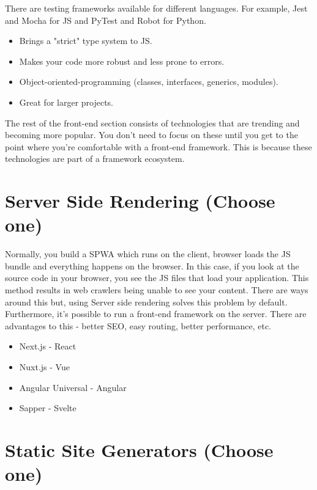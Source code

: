There are testing frameworks available for different languages. For example, Jest and Mocha for JS and PyTest and Robot for Python.
\begin{itemize}
    \item Brings a "strict" type system to JS. 
    \item Makes your code more robust and less prone to errors.
    \item Object-oriented-programming (classes, interfaces, generics, modules).
    \item Great for larger projects.
\end{itemize}
\begin{tcolorbox}
    The rest of the front-end section consists of technologies that are trending and becoming more popular. You don't need to focus on these until you get to the point where you're comfortable with a front-end framework. This is because these technologies are part of a framework ecosystem.
\end{tcolorbox}


\section{Server Side Rendering \small{(Choose one)}}

Normally, you build a SPWA which runs on the client, browser loads the JS bundle and everything happens on the browser. In this case, if you look at the source code in your browser, you see the JS files that load your application. This method results in web crawlers being unable to see your content. There are ways around this but, using Server side rendering solves this problem by default. Furthermore, it's possible to run a front-end framework on the server. There are advantages to this - better SEO, easy routing, better performance, etc. 

\begin{itemize}
    \item Next.js - React
    \item Nuxt.js - Vue
    \item Angular Universal - Angular
    \item Sapper - Svelte
\end{itemize}

\section{Static Site Generators \small{(Choose one)}}

